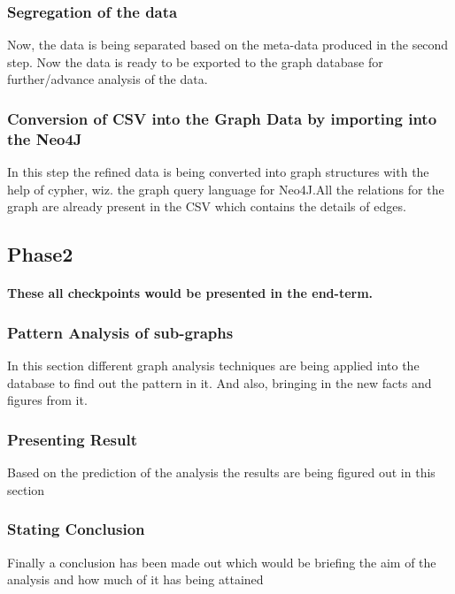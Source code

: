 \subsubsection{Segregation of the data}

Now, the data is being separated based on the meta-data produced in the second step. Now the data is ready to be exported to the graph database for further/advance analysis of the data.

\subsubsection{Conversion of CSV into the Graph Data by importing into the Neo4J}

In this step the refined data is being converted into graph structures with the help of cypher, wiz. the graph query language for Neo4J.All the relations for the graph are already present in the CSV which contains the details of edges.

\subsection{Phase2}

\paragraph{These all checkpoints would be presented in the end-term.}

\subsubsection{Pattern Analysis of sub-graphs}

In this section different graph analysis techniques are being applied into the database to find out the pattern in it. And also, bringing in the new facts and figures from it.

\subsubsection{Presenting Result}

Based on the prediction of the analysis the results are being figured out in this section

\subsubsection{Stating Conclusion}

Finally a conclusion has been made out which would be briefing the aim of the analysis and how much of it has being attained